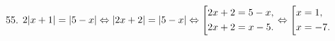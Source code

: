 55. $2|x+1|=|5-x|\Leftrightarrow|2x+2|=|5-x|\Leftrightarrow\left[\begin{gathered}
     2x+2=5-x,\hfill\\
     2x+2=x-5.\hfill \end{gathered}\right.\Leftrightarrow\left[\begin{gathered}
     x=1,\hfill\\
     x=-7.\hfill \end{gathered}\right.$\\
